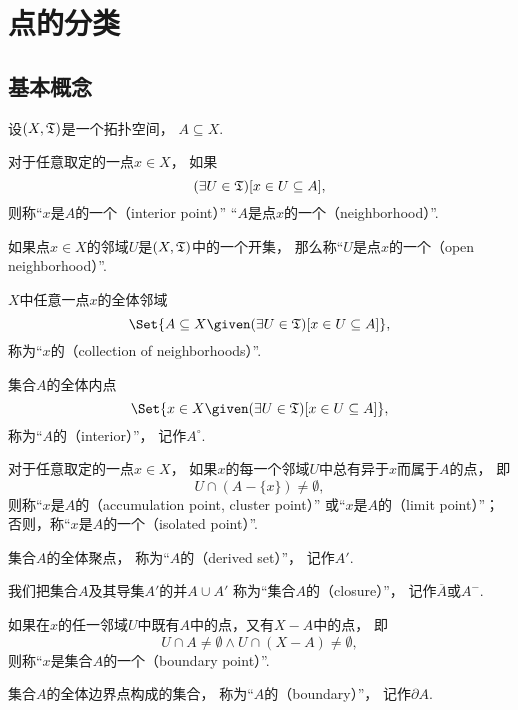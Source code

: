 \section{点的分类}
\subsection{基本概念}
\begin{definition}\label{definition:拓扑学.点的分类}
设\((X,\mathfrak T)\)是一个拓扑空间，
\(A \subseteq X\).

对于任意取定的一点\(x \in X\)，
如果\[
	(\exists U\in\mathfrak T)
	[x \in U \subseteq A],
\]
则称“\(x\)是\(A\)的一个（interior point）”
“\(A\)是点\(x\)的一个（neighborhood）”.

如果点\(x \in X\)的邻域\(U\)是\((X,\mathfrak T)\)中的一个开集，
那么称“\(U\)是点\(x\)的一个（open neighborhood）”.

\(X\)中任意一点\(x\)的全体邻域\[
	\Set{
		A \subseteq X \given (\exists U\in\T)[x \in U \subseteq A]
	},
\]
称为“\(x\)的（collection of neighborhoods）”.

集合\(A\)的全体内点\[
	\Set{
		x \in X \given (\exists U\in\T)[x \in U \subseteq A]
	},
\]
称为“\(A\)的（interior）”，
记作\(A^\circ\).

对于任意取定的一点\(x \in X\)，
如果\(x\)的每一个邻域\(U\)中总有异于\(x\)而属于\(A\)的点，
即\[
	U \cap (A - \{x\}) \neq \emptyset,
\]
则称“\(x\)是\(A\)的（accumulation point, cluster point）”
或“\(x\)是\(A\)的（limit point）”；
否则，称“\(x\)是\(A\)的一个（isolated point）”.

集合\(A\)的全体聚点，
称为“\(A\)的（derived set）”，
记作\(A'\).

我们把集合\(A\)及其导集\(A'\)的并\(A \cup A'\)
称为“集合\(A\)的（closure）”，
记作\(\overline{A}\)或\(A^-\).

如果在\(x\)的任一邻域\(U\)中既有\(A\)中的点，又有\(X - A\)中的点，
即\[
	U \cap A \neq \emptyset
	\land
	U \cap (X-A) \neq \emptyset,
\]
则称“\(x\)是集合\(A\)的一个（boundary point）”.

集合\(A\)的全体边界点构成的集合，
称为“\(A\)的（boundary）”，
记作\(\partial A\).
\end{definition}

